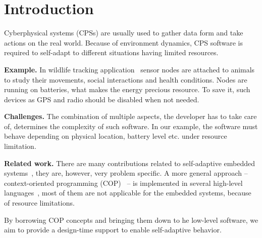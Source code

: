 \section{Introduction}
Cyberphysical systems (CPSs) are usually used to gather data form and take
actions on the real world. Because of environment dynamics, CPS software is
required to self-adapt to different situations having limited resources.

{\bfseries Example.} In wildlife tracking application~\cite{pasztor10:selective} sensor
nodes are attached to animals to study their movements, social interactions and
health conditions. Nodes are running on batteries, what makes the
energy precious resource. To save it, such
devices as GPS and radio should be disabled when not needed.

{\bfseries Challenges.} The combination of multiple aspects, the developer has
to take care of, determines the complexity of such software. In our example, the
software must behave depending on physical location, battery level etc. under resource limitation.

{\bfseries Related work.} There are many contributions related to self-adaptive
embedded systems~\cite{Zimmerling12,Bourdenas11}, they are, however, very
problem specific. A more general approach -- context-oriented programming (COP)~\cite{Hirschfeld08} -- is implemented in several high-level
languages~\cite{Bardram05,Ghezzi10,Kamina11,Salvaneschi12,Sehic11}, most of them
are not applicable for the embedded systems, because of resource limitations.

By borrowing COP concepts and bringing them down to he low-level software, we
aim to provide a design-time support to enable self-adaptive behavior.
